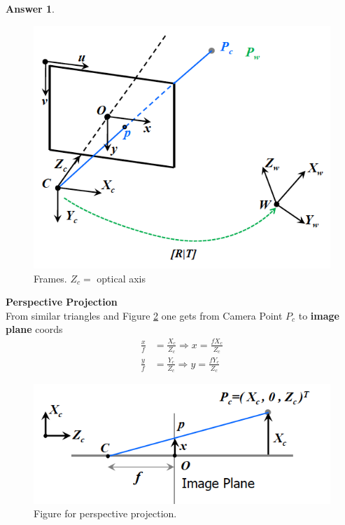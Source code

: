 \documentclass[a4paper,12 pt]{article}
\theoremstyle{definition}
\theoremstyle{remark}
\theoremstyle{definition}
\theoremstyle{definition}
\theoremstyle{definition}
\theoremstyle{definition}
\theoremstyle{remark}
\theoremstyle{remark}
\theoremstyle{definition}
\theoremstyle{definition}
\newtheorem*{answer}{Answer}
\begin{document}
\begin{enumerate}
\begin{enumerate}
\begin{answer}
\begin{figure}[h!]
\begin{center}
\includegraphics[scale=0.3]{pics/perspective}
\caption{Frames. $Z_c=$ optical axis \label{fig:perspective}}
\end{center}
\end{figure}
\textbf{Perspective Projection }\\
From similar triangles and Figure \ref{fig:proj} one gets from Camera Point $P_c$ to \textbf{image plane} coords
\begin{equation}
\begin{split}
\frac{x}{f}&=\frac{X_c}{Z_c} \Rightarrow x=\frac{fX_c}{Z_c}\\
\frac{y}{f}&=\frac{Y_c}{Z_c} \Rightarrow y=\frac{fY_c}{Z_c}
\end{split}
\end{equation}
\begin{figure}[h!]
\begin{center}
\includegraphics[scale=0.5]{pics/proj}
\caption{Figure for perspective projection. \label{fig:proj}}
\end{center}
\end{figure}

\end{answer}
\end{enumerate}
\end{enumerate}
\end{document}
